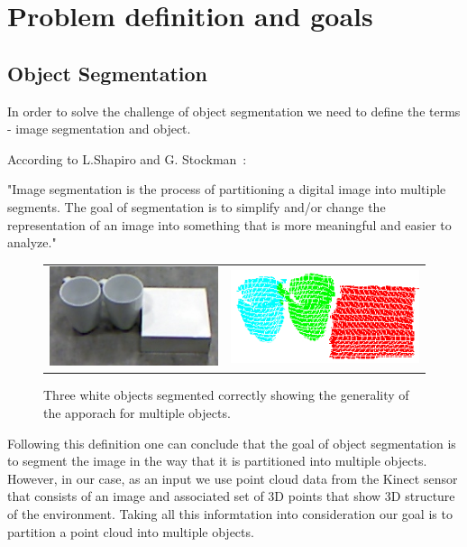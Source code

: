 \section{Problem definition and goals}

\subsection{Object Segmentation} 

In order to solve the challenge of object segmentation we need to define the terms - image segmentation and object. 

According to L.Shapiro and G. Stockman~\cite{shapiro2001computer}:

"Image segmentation is the process of partitioning a digital image into multiple segments. The goal of segmentation is to simplify and/or change the representation of an image into something that is more meaningful and easier to analyze."

\begin{figure}[ht]
\begin{tabular}{cccc}

\multicolumn{2}{c}{\includegraphics[width=0.45\columnwidth]{figures/3objects/after_push.jpg}}
& \multicolumn{2}{c}{\includegraphics[width=0.45\columnwidth]{figures/3objects/segmented.png}}

\end{tabular}
\caption{Three white objects segmented correctly showing the generality of the apporach for multiple objects.}
\label{fig:three_objects}
\end{figure}


 Following this definition one can conclude that the goal of object segmentation is to segment the image in the way that it is partitioned into multiple objects. However, in our case, as an input we use point cloud data from the Kinect sensor that consists of an image and associated set of 3D points that show 3D structure of the environment. Taking all this informtation into consideration our goal is to partition a point cloud into multiple objects.

